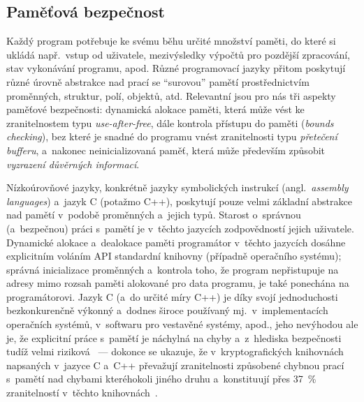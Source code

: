 \subsection{Paměťová bezpečnost}

Každý program potřebuje ke svému běhu určité množství paměti, do které si ukládá např.\ vstup od uživatele, mezivýsledky výpočtů pro pozdější zpracování, stav vykonávání programu, apod. Různé programovací jazyky přitom poskytují různé úrovně abstrakce nad prací se ``surovou'' pamětí prostřednictvím proměnných, struktur, polí, objektů, atd. Relevantní jsou pro nás tři aspekty paměťové bezpečnosti: dynamická alokace paměti, která může vést ke zranitelnostem typu \textit{use-after-free}, dále kontrola přístupu do paměti (\textit{bounds checking}), bez které je snadné do programu vnést zranitelnosti typu \textit{přetečení bufferu}, a~nakonec neinicializovaná paměť, která může především způsobit \textit{vyzrazení důvěrných informací}.

Nízkoúrovňové jazyky, konkrétně jazyky symbolických instrukcí (angl.\ \textit{assembly languages}) a~jazyk C (potažmo C++), poskytují pouze velmi základní abstrakce nad pamětí v~podobě proměnných a~jejich typů. Starost o~správnou (a~bezpečnou) práci s~pamětí je v~těchto jazycích zodpovědností jejich uživatele. Dynamické alokace a~dealokace paměti programátor v~těchto jazycích dosáhne explicitním voláním API standardní knihovny (případně operačního systému); správná inicializace proměnných a~kontrola toho, že program nepřistupuje na adresy mimo rozsah paměti alokované pro data programu, je také ponechána na programátorovi. Jazyk C (a~do určité míry C++) je díky svojí jednoduchosti bezkonkurenčně výkonný a~dodnes široce používaný mj.\ v~implementacích operačních systémů, v~softwaru pro vestavěné systémy, apod., jeho nevýhodou ale je, že explicitní práce s~pamětí je náchylná na chyby a~z~hlediska bezpečnosti tudíž velmi riziková~\cite{gaynor2020} --- dokonce se ukazuje, že v~kryptografických knihovnách napsaných v~jazyce C a~C++ převažují zranitelnosti způsobené chybnou prací s~pamětí nad chybami kteréhokoli jiného druhu a~konstituují přes 37~\% zranitelností v~těchto knihovnách~\cite{youreallyshouldnt}.

